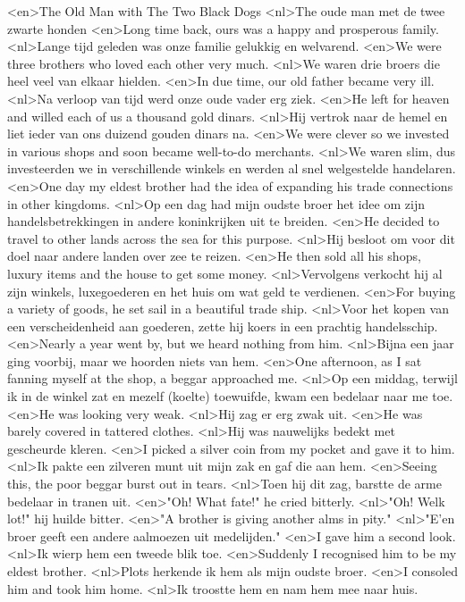 <en>The Old Man with The Two Black Dogs
<nl>The oude man met de twee zwarte honden
<en>Long time back, ours was a happy and prosperous family.
<nl>Lange tijd geleden was  onze familie gelukkig en welvarend.
<en>We were three brothers who loved each other very much.
<nl>We waren  drie broers die heel veel van elkaar hielden.
<en>In due time, our old father became very ill.
<nl>Na verloop van tijd werd onze oude vader erg ziek.
<en>He left for heaven and willed each of us a thousand gold dinars.
<nl>Hij vertrok naar de hemel en liet ieder van ons duizend gouden dinars na.
<en>We were clever so we invested in various shops and soon became well-to-do merchants.
<nl>We waren slim, dus investeerden we in verschillende winkels en werden al snel welgestelde handelaren.
<en>One day my eldest brother had the idea of expanding his trade connections in other kingdoms.
<nl>Op een dag had mijn oudste broer het idee om zijn handelsbetrekkingen in andere koninkrijken uit te breiden.
<en>He decided to travel to other lands across the sea for this purpose.
<nl>Hij besloot om voor dit doel naar andere landen over zee te reizen.
<en>He then sold all his shops, luxury items and the house to get some money.
<nl>Vervolgens verkocht hij al zijn winkels, luxegoederen en het huis om wat geld te verdienen.
<en>For buying a variety of goods, he set sail in a beautiful trade ship.
<nl>Voor het kopen van een verscheidenheid aan goederen, zette hij koers in een prachtig handelsschip.
<en>Nearly a year went by, but we heard nothing from him.
<nl>Bijna een jaar ging voorbij, maar we hoorden niets van hem.
<en>One afternoon, as I sat fanning myself at the shop, a beggar approached me.
<nl>Op een middag, terwijl ik in de winkel zat en mezelf (koelte) toewuifde, kwam een bedelaar naar me toe.
<en>He was looking very weak.
<nl>Hij zag er erg zwak uit.
<en>He was barely covered in tattered clothes.
<nl>Hij was nauwelijks bedekt met gescheurde kleren.
<en>I picked a silver coin from my pocket and gave it to him.
<nl>Ik pakte een zilveren munt uit mijn zak en gaf die aan hem.
<en>Seeing this, the poor beggar burst out in tears.
<nl>Toen hij dit zag, barstte de arme bedelaar in tranen uit.
<en>"Oh! What fate!" he cried bitterly.
<nl>"Oh! Welk lot!" hij huilde bitter.
<en>"A brother is giving another alms in pity."
<nl>"E'en broer geeft een andere  aalmoezen uit medelijden."
<en>I gave him a second look.
<nl>Ik wierp hem een tweede blik toe.
<en>Suddenly I recognised him to be my eldest brother.
<nl>Plots herkende ik hem als mijn oudste broer.
<en>I consoled him and took him home.
<nl>Ik troostte hem en nam hem mee naar huis.
